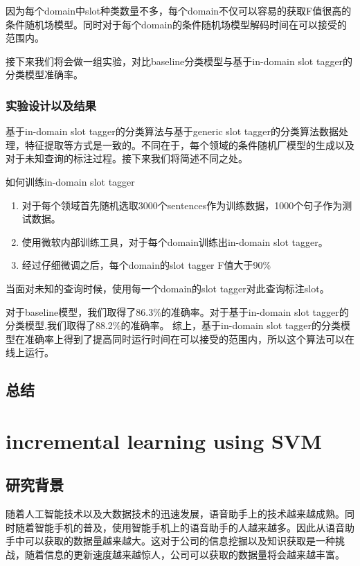 \documentclass[master]{njuthesis}
\begin{document}
    因为每个domain中slot种类数量不多，每个domain不仅可以容易的获取F值很高的条件随机场模型。同时对于每个domain的条件随机场模型解码时间在可以接受的范围内。
    
    接下来我们将会做一组实验，对比baseline分类模型与基于in-domain slot tagger的分类模型准确率。

\subsection{实验设计以及结果}
    
    基于in-domain slot tagger的分类算法与基于generic slot tagger的分类算法数据处理，特征提取等方式是一致的。不同在于，每个领域的条件随机厂模型的生成以及对于未知查询的标注过程。接下来我们将简述不同之处。
   
    如何训练in-domain slot tagger
    \begin{enumerate}
      \item 对于每个领域首先随机选取3000个sentences作为训练数据，1000个句子作为测试数据。
      \item 使用微软内部训练工具，对于每个domain训练出in-domain slot tagger。
      \item 经过仔细微调之后，每个domain的slot tagger F值大于90\%
    \end{enumerate}

    当面对未知的查询时候，使用每一个domain的slot tagger对此查询标注slot。

    对于baseline模型，我们取得了86.3\%的准确率。对于基于in-domain slot tagger的分类模型,我们取得了88.2\%的准确率。
    综上，基于in-domain slot tagger的分类模型在准确率上得到了提高同时运行时间在可以接受的范围内，所以这个算法可以在线上运行。

\section{总结}

\chapter{incremental learning using SVM}\label{chapter_smallworld}

\section{研究背景}

   随着人工智能技术以及大数据技术的迅速发展，语音助手上的技术越来越成熟。同时随着智能手机的普及，使用智能手机上的语音助手的人越来越多。因此从语音助手中可以获取的数据量越来越大。这对于公司的信息挖掘以及知识获取是一种挑战，随着信息的更新速度越来越惊人，公司可以获取的数据量将会越来越丰富。
   
\end{document}
